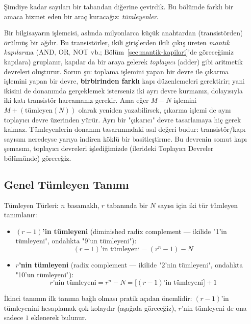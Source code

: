 Şimdiye kadar sayıları bir tabandan diğerine çevirdik. Bu bölümde farklı bir amaca hizmet eden
bir araç kuracağız: \emph{tümleyenler}.

\begin{bilginot}
Bir bilgisayarın işlemcisi, aslında milyonlarca küçük anahtardan (transistörden) örülmüş bir
ağdır. Bu transistörler, ikili girişlerden ikili çıkış üreten \emph{mantık kapıları}na (AND,
OR, NOT vb.; Bölüm~\ref{sec:mantik-kapilari}'de göreceğimiz kapılara) gruplanır, kapılar da
bir araya gelerek \emph{toplayıcı} (adder) gibi aritmetik devreleri oluşturur. Sorun şu:
toplama işlemini yapan bir devre ile çıkarma işlemini yapan bir devre, \textbf{birbirinden
farklı} kapı düzenlemeleri gerektirir; yani ikisini de donanımda gerçeklemek isterseniz iki
ayrı devre kurmanız, dolayısıyla iki katı transistör harcamanız gerekir. Ama eğer $M-N$
işlemini $M+(\text{tümleyen}(N))$ olarak yeniden yazabilirsek, çıkarma işlemi de aynı toplayıcı
devre üzerinden yürür. Ayrı bir "çıkarıcı" devre tasarlamaya hiç gerek kalmaz. Tümleyenlerin
donanım tasarımındaki asıl değeri budur: transistör/kapı sayısını neredeyse yarıya indiren
köklü bir basitleştirme. Bu devrenin somut kapı şemasını, toplayıcı devreleri işlediğimizde
(ilerideki Toplayıcı Devreler bölümünde) göreceğiz.
\end{bilginot}

\subsection{Genel Tümleyen Tanımı}
\label{sec:tumleyen-tanim}

\begin{tanim}{Tümleyen Türleri:}
$n$ basamaklı, $r$ tabanında bir $N$ sayısı için iki tür tümleyen tanımlanır:
\begin{itemize}[nosep, leftmargin=*]
    \item \textbf{$(r{-}1)$'in tümleyeni} (diminished radix
    complement --- ikilide "1'in tümleyeni", ondalıkta "9'un tümleyeni"):
    \[
    (r{-}1)\text{'in tümleyeni} = (r^n-1) - N
    \]
    \item \textbf{$r$'nin tümleyeni} (radix complement --- ikilide
    "2'nin tümleyeni", ondalıkta "10'un tümleyeni"):
    \[
    r\text{'nin tümleyeni} = r^n - N = \big[(r{-}1)\text{'in tümleyeni}\big] + 1
    \]
\end{itemize}
İkinci tanımın ilk tanıma bağlı olması pratik açıdan önemlidir: $(r{-}1)$'in tümleyenini
hesaplamak çok kolaydır (aşağıda göreceğiz), $r$'nin tümleyeni de ona sadece $1$ eklenerek
bulunur.
\end{tanim}

